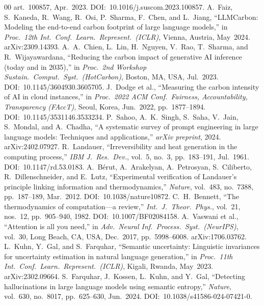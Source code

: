 \documentclass[conference]{IEEEtran}
\begin{document}
\begin{thebibliography}{00}
art.~100857, Apr.~2023.
DOI:~10.1016/j.suscom.2023.100857.
A.~Faiz, S.~Kaneda, R.~Wang, R.~Osi, P.~Sharma, F.~Chen, and
L.~Jiang,
``LLMCarbon: Modeling the end-to-end carbon footprint of large
language models,''
in \textit{Proc.\ 12th Int.\ Conf.\ Learn.\ Represent.\ (ICLR)},
Vienna, Austria, May~2024.
arXiv:2309.14393.
A.~A.~Chien, L.~Lin, H.~Nguyen, V.~Rao, T.~Sharma, and
R.~Wijayawardana,
``Reducing the carbon impact of generative AI inference (today
and in 2035),''
in \textit{Proc.\ 2nd Workshop Sustain.\ Comput.\ Syst.\
(HotCarbon)}, Boston, MA, USA, Jul.~2023.
DOI:~10.1145/3604930.3605705.
J.~Dodge et al.,
``Measuring the carbon intensity of AI in cloud instances,''
in \textit{Proc.\ 2022 ACM Conf.\ Fairness, Accountability,
Transparency (FAccT)}, Seoul, Korea, Jun.~2022,
pp.~1877--1894.
DOI:~10.1145/3531146.3533234.
P.~Sahoo, A.~K.~Singh, S.~Saha, V.~Jain, S.~Mondal, and
A.~Chadha,
``A systematic survey of prompt engineering in large language
models: Techniques and applications,''
\textit{arXiv preprint}, 2024.
arXiv:2402.07927.
R.~Landauer,
``Irreversibility and heat generation in the computing process,''
\textit{IBM J.~Res.\ Dev.}, vol.~5, no.~3,
pp.~183--191, Jul.~1961.
DOI:~10.1147/rd.53.0183.
A.~B\'erut, A.~Arakelyan, A.~Petrosyan, S.~Ciliberto,
R.~Dillenschneider, and E.~Lutz,
``Experimental verification of Landauer's principle linking
information and thermodynamics,''
\textit{Nature}, vol.~483, no.~7388, pp.~187--189, Mar.~2012.
DOI:~10.1038/nature10872.
C.~H.~Bennett,
``The thermodynamics of computation---a review,''
\textit{Int.~J.~Theor.\ Phys.}, vol.~21, nos.~12,
pp.~905--940, 1982.
DOI:~10.1007/BF02084158.
A.~Vaswani et al.,
``Attention is all you need,''
in \textit{Adv.\ Neural Inf.\ Process.\ Syst.\ (NeurIPS)},
vol.~30, Long Beach, CA, USA, Dec.~2017, pp.~5998--6008.
arXiv:1706.03762.
L.~Kuhn, Y.~Gal, and S.~Farquhar,
``Semantic uncertainty: Linguistic invariances for uncertainty
estimation in natural language generation,''
in \textit{Proc.\ 11th Int.\ Conf.\ Learn.\ Represent.\ (ICLR)},
Kigali, Rwanda, May~2023.
arXiv:2302.09664.
S.~Farquhar, J.~Kossen, L.~Kuhn, and Y.~Gal,
``Detecting hallucinations in large language models using
semantic entropy,''
\textit{Nature}, vol.~630, no.~8017, pp.~625--630, Jun.~2024.
DOI:~10.1038/s41586-024-07421-0.

\end{thebibliography}
\end{document}
